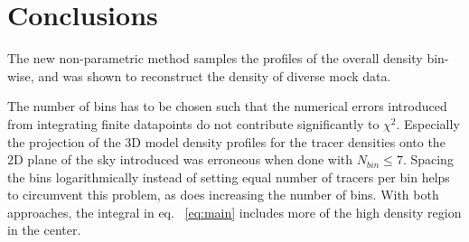 \section{Conclusions}\label{sec:conclusions}

The new non-parametric method samples the profiles of the overall
density bin-wise, and was shown to reconstruct the density of diverse
mock data.

The number of bins has to be chosen such that the numerical errors
introduced from integrating finite datapoints do not contribute
significantly to $\chi^2$. Especially the projection of the 3D model
density profiles for the tracer densities onto the 2D plane of the sky
introduced was erroneous when done with $N_{bin}\leq7$. Spacing the
bins logarithmically instead of setting equal number of tracers per
bin helps to circumvent this problem, as does increasing the number of
bins. With both approaches, the integral in eq. ~\ref{eq:main}
includes more of the high density region in the center.

